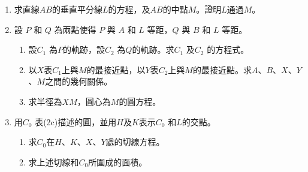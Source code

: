 \documentclass[12pt]{article}
\begin{document}
    \begin{enumerate}
        \item 求直線$AB$的垂直平分線$L$的方程，及$AB$的中點$M$。證明$L$通過$M$。
        \item 設 $P$ 和 $Q$ 為兩點使得 $P$ 與 $A$ 和 $L$ 等距，$Q$ 與 $B$ 和 $L$ 等距。 \begin{enumerate}
            \item 設$C_1$ 為$P$的軌跡，設$C_2$ 為$Q$的軌跡。求$C_1$ 及$C_2$ 的方程式。
            \item 以$X$表$C_1$上與$M$的最接近點，以$Y$表$C_2$上與$M$的最接近點。求$A$、$B$、$X$、$Y$、$M$之間的幾何關係。
            \item 求半徑為$XM$，圓心為$M$的圓方程。
        \end{enumerate}
        \item 用$C_0$ 表(2c)描述的圓，並用$H$及$K$表示$C_0$ 和$L$的交點。 \begin{enumerate}
            \item 求$C_0$在$H$、$K$、$X$、$Y$處的切線方程。
            \item 求上述切線和$C_0$所圍成的面積。
        \end{enumerate}
    \end{enumerate}
\end{document}
